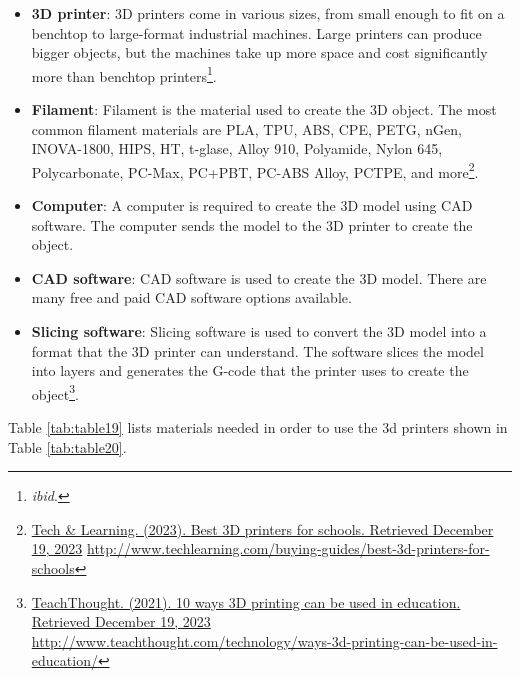 \documentclass[12pt,letterpaper,twoside]{extreport}
\begin{document}
\begin{itemize}[leftmargin=*]
\item \textbf{3D printer}: 3D printers come in various sizes, from small enough to fit on a benchtop to large-format industrial machines. Large printers can produce bigger objects, but the machines take up more space and cost significantly more than benchtop printers\footnote{\raggedright \textit{ibid}.}.
\item \textbf{Filament}: Filament is the material used to create the 3D object. The most common filament materials are PLA, TPU, ABS, CPE, PETG, nGen, INOVA-1800, HIPS, HT, t-glase, Alloy 910, Polyamide, Nylon 645, Polycarbonate, PC-Max, PC+PBT, PC-ABS Alloy, PCTPE, and more\footnote{\raggedright \href{http://www.techlearning.com/buying-guides/best-3d-printers-for-schools}{Tech \& Learning. (2023). Best 3D printers for schools. Retrieved December 19, 2023} \url{http://www.techlearning.com/buying-guides/best-3d-printers-for-schools}}.
\item \textbf{Computer}: A computer is required to create the 3D model using CAD software. The computer sends the model to the 3D printer to create the object.
\item \textbf{CAD software}: CAD software is used to create the 3D model. There are many free and paid CAD software options available.
\item \textbf{Slicing software}: Slicing software is used to convert the 3D model into a format that the 3D printer can understand. The software slices the model into layers and generates the G-code that the printer uses to create the object\footnote{\raggedright \href{http://www.teachthought.com/technology/ways-3d-printing-can-be-used-in-education/}{TeachThought. (2021). 10 ways 3D printing can be used in education. Retrieved December 19, 2023} \url{http://www.teachthought.com/technology/ways-3d-printing-can-be-used-in-education/}}.
\end{itemize}
Table \ref{tab:table19} lists materials needed in order to use the 3d printers shown in Table \ref{tab:table20}.
\end{document}
